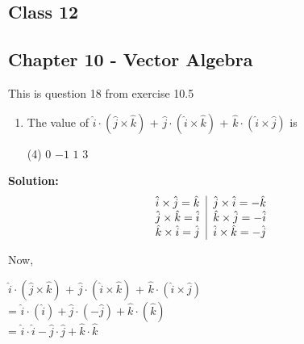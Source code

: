 \documentclass[12pt]{article}
\begin{document}
\begin{center}
	\section*{\textbf{Class 12}}
	\subsection*{Chapter 10 - Vector Algebra}
\end{center}
This is question 18 from exercise 10.5 \\
\begin{enumerate}
\item  The value of  $\hat{i} \cdot (\hat{j} \times \hat{k})$  + $\hat{j} \cdot (\hat{i} \times \hat{k})$ + $\hat{k} \cdot (\hat{i} \times \hat{j} )$ is
	\begin{tasks}(4)
    \task $0$ 
    \task $-1$ 
    \task $1$ 
    \task $3$  
\end{tasks}
\end{enumerate}
\textbf{Solution:}
\[
\begin{aligned}
\begin{tabular} {l|l}
$\hat{i} \times \hat{j} = \hat{k}$ &$\hat{j} \times \hat{i} = -\hat{k}$ \\
$\hat{j} \times \hat{k} = \hat{i}$ & $\hat{k} \times \hat{j} = -\hat{i}$ \\
$\hat{k} \times \hat{i} = \hat{j}$ &$\hat{i} \times \hat{k} = -\hat{j}$ \\
\end{tabular}
\end{aligned}
\]

Now,\\
\begin{center} 
$\hat{i} \cdot (\hat{j} \times \hat{k})$  + $\hat{j} \cdot (\hat{i} \times \hat{k})$ + $\hat{k} \cdot (\hat{i} \times \hat{j} )$ \\
= $\hat{i} \cdot (\hat{i}) + \hat{j} \cdot (-\hat{j}) + \hat{k} \cdot (\hat{k})$ \\
= $\hat{i} \cdot \hat{i} - \hat{j} \cdot \hat{j} + \hat{k} \cdot \hat{k}$ \\
\end{center}

\end{document}
